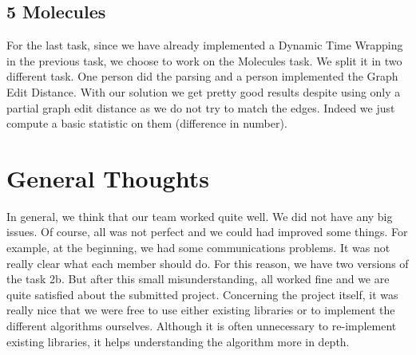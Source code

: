 \documentclass[12pt]{article}
\begin{document}
\subsection*{5 Molecules}
For the last task, since we have already implemented a Dynamic Time Wrapping in the previous task, we choose to work on the Molecules task. We split it in two different task. One person did the parsing and a person implemented the Graph Edit Distance.
With our solution we get pretty good results despite using only a partial graph edit distance as we do not try to match the edges.
Indeed we just compute a basic statistic on them (difference in number). 

\section*{General Thoughts}
In general, we think that our team worked quite well. We did not have any big issues. Of course, all was not perfect and we could had improved some things. For example, at the beginning, we had some communications problems. It was not really clear what each member should do. For this reason, we have two versions of the task 2b. But after this small misunderstanding, all worked fine and we are quite satisfied about the submitted project.
\newline Concerning the project itself, it was really nice that we were free to use either existing libraries or to implement the different algorithms ourselves. Although it is often unnecessary to re-implement existing libraries, it helps understanding the algorithm more in depth.
\end{document}
